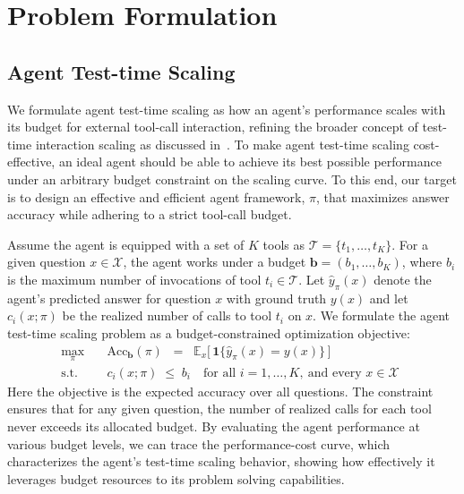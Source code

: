 \section{Problem Formulation}

\subsection{Agent Test-time Scaling}

We formulate agent test-time scaling as how an agent's performance scales with its budget for external tool-call interaction, refining the broader concept of test-time interaction scaling as discussed in~\citet{DBLP:journals/corr/abs-2506-07976}. To make agent test-time scaling cost-effective, an ideal agent should be able to achieve its best possible performance under an arbitrary budget constraint on the scaling curve. To this end, our target is to design an effective and efficient agent framework, $\pi$, that maximizes answer accuracy while adhering to a strict tool-call budget. 


Assume the agent is equipped with a set of $K$ tools as $\mathcal{T}=\{t_1, \dots, t_{K}\}$. For a given question $x \in \mathcal{X}$, the agent works under a budget $\mathbf{b}=(b_1,\dots,b_K)$, where $b_i$ is the maximum number of invocations of tool $t_i \in \mathcal{T}$.
Let $\hat{y}_\pi(x)$ denote the agent's predicted answer for question $x$ with ground truth $y(x)$ and let $c_i(x;\pi)$ be the realized number of calls to tool $t_i$ on $x$.
We formulate the agent test-time scaling problem as a budget-constrained optimization objective:
\begin{equation}
\label{eq:tts-per-tool-acc}
\begin{aligned}
\max_{\pi}\quad
& \mathrm{Acc}_{\mathbf{b}}(\pi)
\;\;=\;\; \mathbb{E}_{x}\big[\,\mathbf{1}\{\hat{y}_\pi(x)=y(x)\}\,\big] \\[2pt]
\text{s.t.}\quad
& c_i(x;\pi) \;\le\; b_i \quad \text{for all } i=1,\dots,K,\ \text{and every } x \in \mathcal{X}\ \ 
\end{aligned}
\end{equation}
Here the objective is the expected accuracy over all questions. The constraint ensures that for any given question, the number of realized calls for each tool never exceeds its allocated budget. By evaluating the agent performance at various budget levels, we can trace the performance-cost curve, which characterizes the agent's test-time scaling behavior, showing how effectively it leverages budget resources to its problem solving capabilities.


